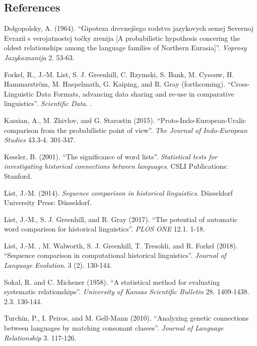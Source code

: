 \documentclass[
  a4paper,
  14pt,
  oneside,
  tablecaptionabove
]{scrbook}
\begin{document}
\subsection*{References}

\nopagebreak\hangindent=0.7cm {\small Dolgopolsky, A. (1964). ``Gipoteza drevnejšego rodstva
jazykovych semej Severnoj Evrazii s verojatnostej točky zrenija {[}A
probabilistic hypothesis concering the oldest relationships among the
language families of Northern Eurasia{]}''. \emph{Voprosy Jazykoznanija}
2. 53-63.}

\nopagebreak\hangindent=0.7cm {\small Forkel, R., J.-M. List, S. J. Greenhill, C. Rzymski, S. Bank, M. Cysouw,
H. Hammarström, M. Haspelmath, G. Kaiping, and R. Gray (forthcoming).
``Cross-Linguistic Data Formats, advancing data sharing and re-use
in comparative linguistics''.  \emph{Scientific Data}. . }

\nopagebreak\hangindent=0.7cm {\small Kassian, A., M. Zhivlov, and G. Starostin (2015).
``Proto-Indo-European-Uralic comparison from the probabilistic
point of view''.  \emph{The Journal of Indo-European Studies} 43.3-4.
301-347. }

\nopagebreak\hangindent=0.7cm {\small Kessler, B. (2001). ``The significance of word lists''.
\emph{Statistical tests for investigating historical connections between
languages}.  CSLI Publications: Stanford. }

\nopagebreak\hangindent=0.7cm {\small List, J.-M. (2014). \emph{Sequence comparison in historical
linguistics}.  Düsseldorf University Press: Düsseldorf. }

\nopagebreak\hangindent=0.7cm {\small List, J.-M., S. J. Greenhill, and R. Gray (2017). ``The potential
of automatic word comparison for historical linguistics''.  \emph{PLOS
ONE} 12.1. 1-18. }

\nopagebreak\hangindent=0.7cm {\small List, J.-M. , M. Walworth, S. J. Greenhill, T. Tresoldi, and R.
Forkel (2018). ``Sequence comparison in computational historical
linguistics''.  \emph{Journal of Language Evolution}. 3 (2). 130-144.}

\nopagebreak\hangindent=0.7cm {\small Sokal, R. and C. Michener (1958). ``A statistical method for
evaluating systematic relationships''.  \emph{University of Kansas
Scientific Bulletin} 28. 1409-1438. 2.3. 130-144.}

\nopagebreak\hangindent=0.7cm {\small Turchin, P., I. Peiros, and M. Gell-Mann (2010). ``Analyzing
genetic connections between languages by matching consonant classes''. 
\emph{Journal of Language Relationship} 3. 117-126. }
\end{document}
